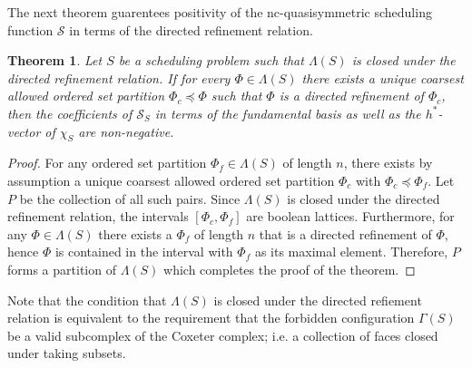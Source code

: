 \documentclass[12pt,reqno]{amsart}
\numberwithin{definition}{section}
\newtheorem{theorem}[definition]{Theorem}
\theoremstyle{definition}
\newcommand{\SSS}{\mathcal{S}}
\newcommand{\allow}{\Lambda} %
\newcommand{\poly}{\chi} %
\newcommand{\forb}{\Gamma} %
\begin{document}
The next theorem guarentees positivity of the nc-quasisymmetric scheduling function $\SSS$ in terms of the directed refinement relation.


\begin{theorem}
\label{unique}
Let $S$ be a scheduling problem such that $\allow(S)$ is closed under the directed refinement relation. If for every $\Phi \in \allow(S)$ there exists a \emph{unique} coarsest allowed ordered set partition $\Phi_c \preceq \Phi$ such that $\Phi$ is a directed refinement of $\Phi_c$, then the coefficients of $\SSS_S$ in terms of the fundamental basis as well as the $h^*$-vector of $\poly_S$ are non-negative.
\end{theorem}

\begin{proof}
For any  ordered set partition $\Phi_f \in \allow(S)$ of length $n$, there exists by assumption a unique coarsest allowed ordered set partition $\Phi_c$ with $\Phi_c\preceq\Phi_f$. Let $P$ be the collection of all such pairs.  Since $\allow(S)$ is closed under the directed refinement relation, the intervals  $[\Phi_c, \Phi_f]$ are boolean lattices.
Furthermore,  for any  $\Phi \in \allow(S)$ there exists a $\Phi_f$ of length $n$ that is a directed refinement of $\Phi$, hence $\Phi$ is contained in the interval with $\Phi_f$ as its maximal element. Therefore, $P$ forms a partition of $\allow(S)$  which completes the proof of the theorem.
\end{proof}


Note that the condition that $\allow(S)$ is closed under the directed
refiement relation is equivalent to the requirement that the forbidden
configuration $\forb(S)$ be a valid subcomplex of the Coxeter complex; i.e. a
collection of faces closed under taking subsets.
\end{document}
